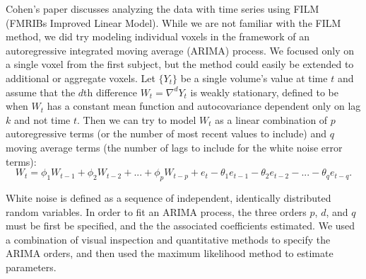 \par \indent Cohen's paper \cite{CohenSelfControl} discusses analyzing the data with time series using FILM (FMRIBs Improved Linear Model). While we are not familiar with the FILM method, we did try modeling individual voxels in the framework of an autoregressive integrated moving average (ARIMA) process. We focused only on a single voxel from the first subject, but the method could easily be extended to additional or aggregate voxels. Let $\{Y_t\}$ be a single volume's value at time $t$ and assume that the $d$th difference $W_t = \nabla^d Y_t$ is weakly stationary, defined to be when $W_t$ has a constant mean function and autocovariance dependent only on lag $k$ and not time $t$. Then we can try to model $W_t$ as a linear combination of $p$ autoregressive terms (or the number of most recent values to include) and $q$ moving average terms (the number of lags to include for the white noise error terms): 
$$W_t = \phi_1 W_{t-1} + \phi_2 W_{t-2} + ... + \phi_p W_{t-p} + e_t - \theta_1 e_{t-1} - \theta_2 e_{t-2} - ... - \theta_q e_{t-q}.$$

\par White noise is defined as a sequence of independent, identically distributed random variables. In order to fit an ARIMA process, the three orders $p$, $d$, and $q$ must be first be specified, and the the associated coefficients estimated. We used a combination of visual inspection and quantitative methods to specify the ARIMA orders, and then used the maximum likelihood method to estimate parameters. 
